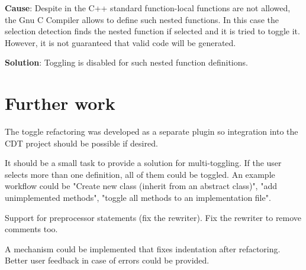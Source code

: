 \textbf{Cause}: Despite in the C++ standard\cite{IsoCpp} function-local 
functions are not allowed, the Gnu C Compiler allows to define such nested 
functions\cite{GCC}. In this case the selection detection finds the nested 
function if selected and it is tried to toggle it. However, it is not guaranteed 
that valid code will be generated.

\textbf{Solution}: Toggling is disabled for such nested function definitions.


\section{Further work}

The toggle refactoring was developed as a separate plugin so integration into 
the CDT project should be possible if desired.

It should be a small task to provide a solution for multi-toggling. If the user 
selects more than one definition, all of them could be toggled. An example 
workflow could be "Create new class (inherit from an abstract class)", "add 
unimplemented methods", "toggle all methods to an implementation file".

Support for preprocessor statements (fix the rewriter). Fix the rewriter to 
remove comments too.

A mechanism could be implemented that fixes indentation after refactoring.
Better user feedback in case of errors could be provided.


